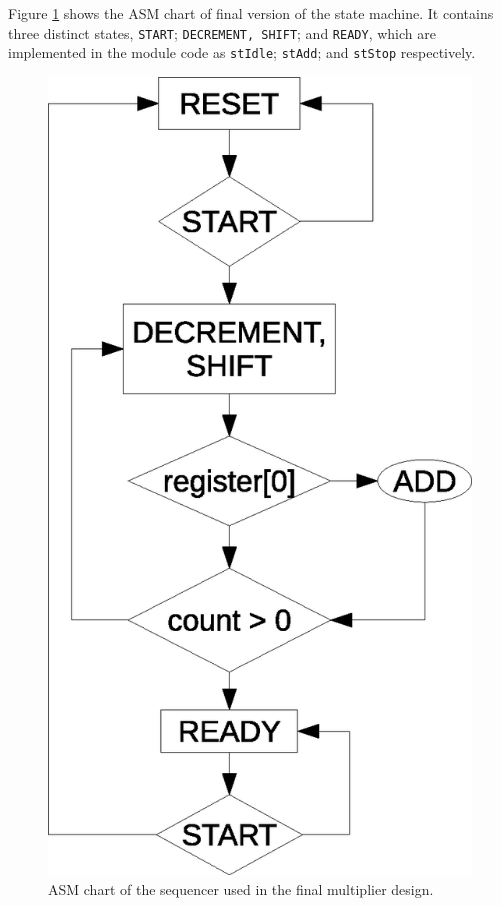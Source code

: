 \documentclass[a4paper,11pt]{article}
\begin{document}
Figure \ref{fig:fseqASM} shows the ASM chart of final version of the state machine. It contains three distinct states, \lstinline{START}; \lstinline{DECREMENT, SHIFT}; and \lstinline{READY}, which are implemented in the module code as \lstinline{stIdle}; \lstinline{stAdd}; and \lstinline{stStop} respectively.

\begin{figure}[H]
    \centering
        \includegraphics[scale=0.65]{finalSequencerASM.eps}
    \caption{ASM chart of the sequencer used in the final multiplier design.}
    \label{fig:fseqASM}
\end{figure}
\end{document}
